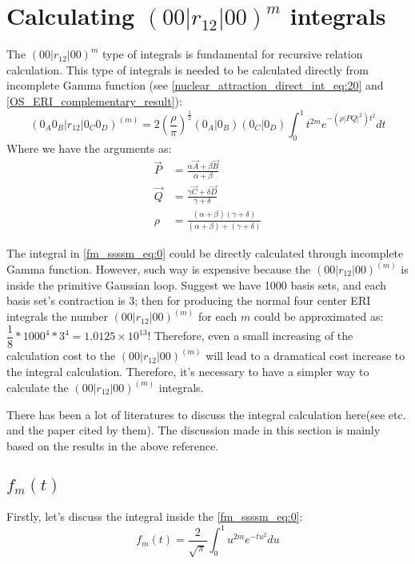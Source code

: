 %
%
\section{Calculating $(00|r_{12}|00)^{m}$ integrals}
%
%
The $(00|r_{12}|00)^{m}$ type of integrals is fundamental
for recursive relation calculation. This type of integrals
is needed to be calculated directly from incomplete Gamma 
function (see \ref{nuclear_attraction_direct_int_eq:20} and 
\ref{OS_ERI_complementary_result}):
\begin{equation}
 (0_{A}0_{B}|r_{12}|0_{C}0_{D})^{(m)} = 
 2\left( \frac{\rho}{\pi}\right)^{\frac{1}{2}}(0_{A}|0_{B})
(0_{C}|0_{D})\int^{1}_{0} t^{2m} e^{-(\rho|PQ|^{2})t^{2}} dt 
\label{fm_ssssm_eq:0}
\end{equation}
Where we have the arguments as:
\begin{align}
 \overrightarrow{P} &= \frac{\alpha \overrightarrow{A} + \beta
\overrightarrow{B}}{\alpha + \beta} \nonumber \\
\overrightarrow{Q} &= \frac{\gamma \overrightarrow{C} + \delta
\overrightarrow{D}}{\gamma + \delta} \nonumber \\
\rho &= \frac{(\alpha+\beta)(\gamma + \delta)}
{(\alpha+\beta)+(\gamma + \delta)}
\end{align}

The integral in \ref{fm_ssssm_eq:0} could be directly calculated through
incomplete Gamma function. However, such way is expensive because the 
$(00|r_{12}|00)^{(m)}$ is inside the primitive Gaussian loop. Suggest
we have 1000 basis sets, and each basis set's contraction is 3; then
for producing the normal four center ERI integrals the number $(00|r_{12}|00)^{(m)}$
for each $m$ could be approximated as: $\dfrac{1}{8}*1000^{4}*3^{4} = 
1.0125\times 10^{13}$! Therefore, even a small increasing of the calculation
cost to the $(00|r_{12}|00)^{(m)}$ will lead to a dramatical cost increase
to the integral calculation. Therefore, it's necessary to have a simpler
way to calculate the $(00|r_{12}|00)^{(m)}$ integrals.

There has been a lot of literatures to discuss the integral calculation here(see 
\cite{harris1983sssm, gill1991two} etc. and the paper cited by them). The discussion
made in this section is mainly based on the results in the above reference.

\subsection{$f_{m}(t)$}
%
%
Firstly, let's discuss the integral inside the \ref{fm_ssssm_eq:0}:
\begin{equation}\label{fm_ssssm_fmt_eq:1}
 f_{m}(t) = \frac{2}{\sqrt{\pi}}\int^{1}_{0} u^{2m} e^{-tu^{2}} du 
\end{equation}

